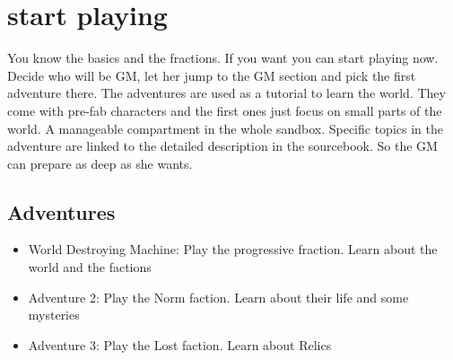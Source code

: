 \section{start playing}

You know the basics and the fractions. If you want you can start playing now. Decide who will be GM, let her jump to the GM section and pick the first adventure there.
The adventures are used as a tutorial to learn the world. They come with pre-fab characters and the first ones just focus on small parts of the world. A manageable compartment in the whole sandbox.
Specific topics in the adventure are linked to the detailed description in the sourcebook. So the GM can prepare as deep as she wants.

\subsection{Adventures}

\begin{itemize}
\item World Destroying Machine: Play the progressive fraction. Learn about the world and the factions
\item Adventure 2: Play the Norm faction. Learn about their life and some mysteries
\item Adventure 3: Play the Lost faction. Learn about Relics
\end{itemize}